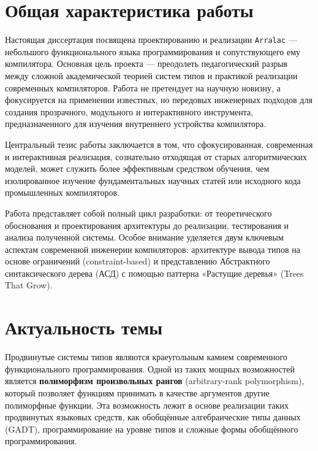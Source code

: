 
\chapter{Общая характеристика работы}

Настоящая диссертация посвящена проектированию и реализации \texttt{Arralac} — небольшого функционального языка программирования и сопутствующего ему компилятора. Основная цель проекта — преодолеть педагогический разрыв между сложной академической теорией систем типов и практикой реализации современных компиляторов. Работа не претендует на научную новизну, а фокусируется на применении известных, но передовых инженерных подходов для создания прозрачного, модульного и интерактивного инструмента, предназначенного для изучения внутреннего устройства компилятора.

Центральный тезис работы заключается в том, что сфокусированная, современная и интерактивная реализация, сознательно отходящая от старых алгоритмических моделей, может служить более эффективным средством обучения, чем изолированное изучение фундаментальных научных статей или исходного кода промышленных компиляторов.

Работа представляет собой полный цикл разработки: от теоретического обоснования и проектирования архитектуры до реализации, тестирования и анализа полученной системы. Особое внимание уделяется двум ключевым аспектам современной инженерии компиляторов: архитектуре вывода типов на основе ограничений (constraint-based) и представлению Абстрактного синтаксического дерева (АСД) с помощью паттерна «Растущие деревья» (Trees That Grow).

\chapter{Актуальность темы}

Продвинутые системы типов являются краеугольным камнем современного функционального программирования. Одной из таких мощных возможностей является \textbf{полиморфизм произвольных рангов} (arbitrary-rank polymorphism), который позволяет функциям принимать в качестве аргументов другие полиморфные функции. Эта возможность лежит в основе реализации таких продвинутых языковых средств, как обобщённые алгебраические типы данных (GADT), программирование на уровне типов и сложные формы обобщённого программирования.

